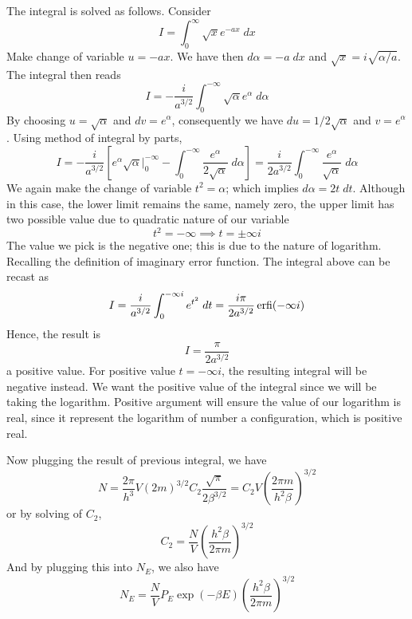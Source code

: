\documentclass[../../../Main.tex]{subfiles}
\begin{document}
The integral is solved as follows. Consider
\begin{equation*}
    I=\int_{0}^{\infty} \sqrt{x}e^{-ax}\;dx
\end{equation*}
Make change of variable $u=-ax$. We have then $d\alpha=-a\;dx$ and $\sqrt{x}=i\sqrt{\alpha/a}$. The integral then reads
\begin{equation*}
    I=-\frac{i}{a^{3/2}}\int_{0}^{-\infty}\sqrt{\alpha}e^\alpha\;d\alpha
\end{equation*}
By choosing $u=\sqrt{\alpha}$ and $dv=e^\alpha$, consequently we have $du=1/2 \sqrt{\alpha}$ and $v=e^\alpha$. Using method of integral by parts,
\begin{equation*}
    I=-\frac{i}{a^{3/2}}\left[e^\alpha \sqrt{\alpha}\bigg|_{0}^{-\infty} -\int_{0 }^{-\infty }\frac{e^\alpha}{2\sqrt{\alpha}}\;d\alpha\right] =\frac{i}{2a^{3/2}}\int_{0 }^{- \infty }\frac{e^\alpha}{\sqrt{\alpha}}\;d\alpha
\end{equation*}
We again make the change of variable $t^2=\alpha$; which implies $d\alpha=2t \;dt$. Although in this case, the lower limit remains the same, namely zero, the upper limit has two possible value due to quadratic nature of our variable
\begin{equation*}
    t^2=-\infty\implies t=\pm \infty i
\end{equation*}
The value we pick is the negative one; this is due to the nature of logarithm. Recalling the definition of imaginary error function. The integral above can be recast as 
\begin{equation*}
    I= \frac{i}{a^{3/2}}\int_{0 }^{- \infty i}e^{t^2} \;dt=\frac{i\pi}{2a^{3/2}}\operatorname{erfi}(- \infty i)
\end{equation*}
Hence, the result is
\begin{equation*}
    I=\frac{\pi}{2a^{3/2}}
\end{equation*}
a positive value. For positive value $t=-\infty i$, the resulting integral will be negative instead. We want the positive value of the integral since we will be taking the logarithm. Positive argument will ensure the value of our logarithm is real, since it represent the logarithm of number a configuration, which is positive real. 

Now plugging the result of previous integral, we have
\begin{equation*}
    N=\frac{2\pi}{h^3}V(2m)^{3/2}C_2\frac{\sqrt{\pi}}{2\beta^{3/2}}=C_2V\left(\frac{2\pi m}{h^2\beta}\right)^{3/2}
\end{equation*}
or by solving of $C_2$, 
\begin{equation*}
    C_2=\frac{N}{V} \left(\frac{h^2\beta}{2\pi m}\right)^{3/2}
\end{equation*}
And by plugging this into $N_E$, we also have 
\begin{equation*}
    N_E=\frac{N}{V}P_E \exp\left(-\beta E\right) \left(\frac{h^2\beta}{2\pi m}\right)^{3/2}
\end{equation*}
\end{document}
